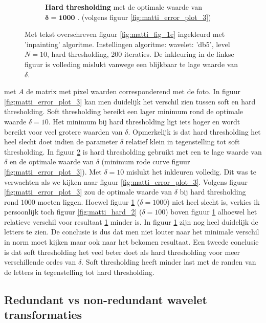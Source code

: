 \begin{figure}
\begin{subfigure}[b]{0.4\textwidth}
        \caption{\textbf{Hard thresholding} met de optimale waarde van $\mathbf{\delta = 1000 }$ . (volgens figuur \ref{fig:matti_error_plot_3})}
        \label{fig:matti_optimal_4}
    \end{subfigure}
    \caption{Met tekst overschreven figuur \ref{fig:matti_fig_1e} ingekleurd met 'inpainting' algoritme. Instellingen algoritme: wavelet: 'db5', level $N = 10$, hard thresholding, 200 iteraties. De inkleuring in de linkse figuur is volleding mislukt vanwege een blijkbaar te lage waarde van $\delta$.} \label{fig:matti_hard_4}
\end{figure}

met $A$ de matrix met pixel waarden corresponderend met de foto. In figuur \ref{fig:matti_error_plot_3} kan men duidelijk het verschil zien tussen soft en hard thresholding. Soft thresholding bereikt een lager minimum rond de optimale waarde $\delta = 10$. Het minimum bij hard thresholding ligt iets hoger en wordt bereikt voor veel grotere waarden van $\delta$. Opmerkelijk is dat hard thresholding het heel slecht doet indien de parameter $\delta$ relatief klein in tegenstelling tot soft thresholding. In figuur \ref{fig:matti_hard_4} is hard thresholding gebruikt met een te lage waarde van $\delta$ en de optimale waarde van $\delta$ (minimum rode curve figuur \ref{fig:matti_error_plot_3}). Met $\delta = 10$ mislukt het inkleuren volledig. Dit was te verwachten als we kijken naar figuur \ref{fig:matti_error_plot_3}. Volgens figuur \ref{fig:matti_error_plot_3} zou de optimale waarde van $\delta$ bij hard thresholding rond $1000$ moeten liggen. Hoewel figuur \ref{fig:matti_optimal_4} ($\delta = 1000$)  niet heel slecht is, verkies ik persoonlijk toch figuur \ref{fig:matti_hard_2} ($\delta = 100$) boven figuur \ref{fig:matti_optimal_4} alhoewel het relatieve verschil voor resultaat \ref{fig:matti_optimal_4} minder is. In figuur \ref{fig:matti_optimal_4} zijn nog heel duidelijk de letters te zien. De conclusie is dus dat men niet louter naar het minimale verschil in norm moet kijken maar ook naar het bekomen resultaat. Een tweede conclusie is dat soft thresholding het veel beter doet als hard thresholding voor meer verschillende ordes van $\delta$. Soft thresholding heeft minder last met de randen van de letters in tegenstelling tot hard thresholding.



\subsection{Redundant vs non-redundant wavelet transformaties}

